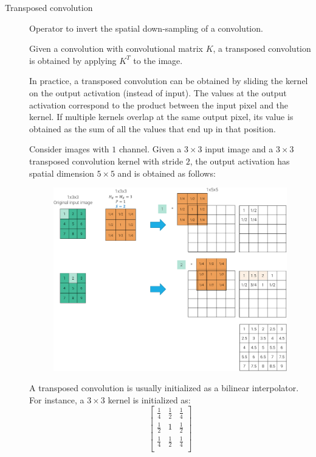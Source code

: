 \begin{description}
    \item[Transposed convolution] 
        Operator to invert the spatial down-sampling of a convolution.

        Given a convolution with convolutional matrix $K$, a transposed convolution is obtained by applying $K^T$ to the image.

        In practice, a transposed convolution can be obtained by sliding the kernel on the output activation (instead of input). The values at the output activation correspond to the product between the input pixel and the kernel. If multiple kernels overlap at the same output pixel, its value is obtained as the sum of all the values that end up in that position.

        \begin{example}
            Consider images with $1$ channel. Given a $3 \times 3$ input image and a $3 \times 3$ transposed convolution kernel with stride $2$, the output activation has spatial dimension $5 \times 5$ and is obtained as follows:
            \begin{figure}[H]
                \centering
                \includegraphics[width=0.9\linewidth]{./img/_transposed_convolution.pdf}
            \end{figure}
        \end{example}

        \begin{remark}
            A transposed convolution is usually initialized as a bilinear interpolator. For instance, a $3 \times 3$ kernel is initialized as:
            \[ 
                \begin{bmatrix}
                    \frac{1}{4} & \frac{1}{2} & \frac{1}{4} \\
                    \frac{1}{2} & 1 & \frac{1}{2} \\
                    \frac{1}{4} & \frac{1}{2} & \frac{1}{4} \\
                \end{bmatrix}
            \]
        \end{remark}


\end{description}
